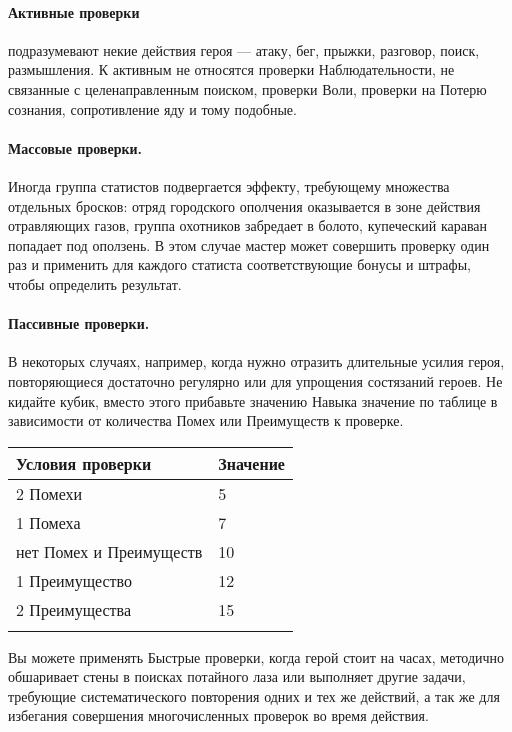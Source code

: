 \paragraph{Активные проверки} подразумевают некие действия героя — атаку, бег, прыжки, разговор, поиск, размышления. К активным не относятся проверки Наблюдательности, не связанные с целенаправленным поиском, проверки Воли, проверки на Потерю сознания, сопротивление яду и тому подобные.
{\paragraph{Массовые проверки.} Иногда группа статистов подвергается эффекту, требующему множества отдельных бросков: отряд городского ополчения оказывается в зоне действия отравляющих газов, группа охотников забредает в болото, купеческий караван попадает под оползень. В этом случае мастер может совершить проверку один раз и применить для каждого статиста соответствующие бонусы и штрафы, чтобы определить результат.
\paragraph{Пассивные проверки.} В некоторых случаях, например, когда нужно отразить длительные усилия героя, повторяющиеся достаточно регулярно или для упрощения состязаний героев. Не кидайте кубик, вместо этого прибавьте значению Навыка значение по таблице в зависимости от количества Помех или Преимуществ к проверке.
\begin{center}
\begin{tabular}{|l|l|}
\hline
Условия проверки & Значение \\ \hline
2 Помехи & 5 \\ \hline
1 Помеха & 7 \\ \hline
нет Помех и Преимуществ & 10 \\ \hline
1 Преимущество & 12 \\ \hline
2 Преимущества & 15 \\ \hline
\\ \hline
\end{tabular}
\end{center}
Вы можете применять Быстрые проверки, когда герой стоит на часах, методично обшаривает стены в поисках потайного лаза или выполняет другие задачи, требующие систематического повторения одних и тех же действий, а так же для избегания совершения многочисленных проверок во время действия.
}
